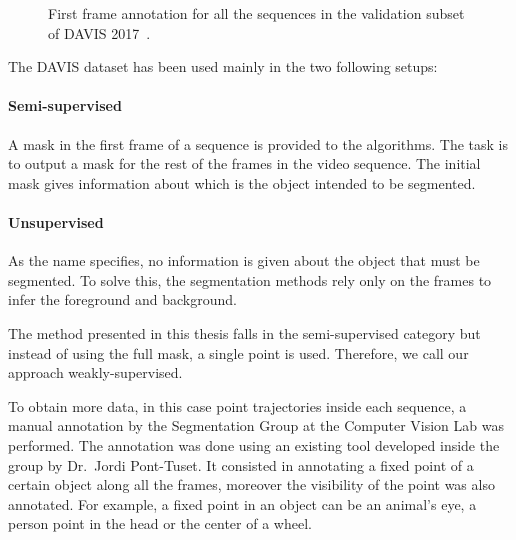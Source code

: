 \begin{figure}[h]
  \centering
  \caption{First frame annotation for all the sequences in the validation subset of DAVIS 2017~\davislast{}. }
  \label{fig:datasets:davis}
\end{figure}


The DAVIS dataset has been used mainly in the two following setups:

\paragraph{Semi-supervised}

A mask in the first frame of a sequence is provided to the algorithms.
The task is to output a mask for the rest of the frames in the video sequence.
The initial mask gives information about which is the object intended to be segmented.

\paragraph{Unsupervised}

As the name specifies, no information is given about the object that must be segmented.
To solve this, the segmentation methods rely only on the frames to infer the foreground and background.

The method presented in this thesis falls in the semi-supervised category but instead of using the full mask, a single point is used. Therefore, we call our approach weakly-supervised.

To obtain more data, in this case point trajectories inside each sequence, a manual annotation by the Segmentation Group at the Computer Vision Lab was performed.
The annotation was done using an existing tool developed inside the group by Dr.~Jordi Pont-Tuset.
It consisted in annotating a fixed point of a certain object along all the frames, moreover the visibility of the point was also annotated.
For example, a fixed point in an object can be an animal's eye, a person point in the head or the center of a wheel.

